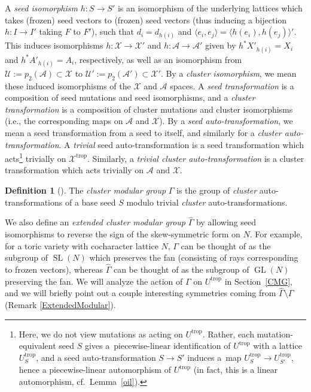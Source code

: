 \documentclass[pdftex]{sigma}
\numberwithin{equation}{section}
\numberwithin{figure}{section}
\numberwithin{table}{section}
\DeclareMathOperator{\SL}{SL}
\DeclareMathOperator{\GL}{GL}
\DeclareMathOperator{\trop}{trop}
\let\rar=\rightarrow
\let\s=\mathcal
\let\wh=\widehat
\theoremstyle{definition}
\newtheorem{dfn}[thm]{Definition}
\begin{document}
A {\it seed isomorphism} $h\colon S\rar S'$ is an isomorphism of the underlying lattices which takes (frozen) seed vectors to (frozen) seed vectors (thus inducing a bijection $h\colon I\rar I'$ taking $F$ to $F'$), such that $d_i=d_{h(i)}$ and $\langle e_i,e_j\rangle = \langle h(e_i),h(e_j)\rangle'$. This induces isomorphisms $h\colon \s{X}\rar \s{X}'$ and $h\colon \s{A}\rar \s{A}'$ given by
	$h^{*}X'_{h(i)} = X_{i}$ and $h^{*}A'_{h(i)} = A_{i}$, respectively, as well as an isomorphism from $\s{U}:=p_2(\s{A})\subset \s{X}$ to $\s{U}':=p_2(\s{A}') \subset \s{X}'$. By a \textit{cluster isomorphism}, we mean these induced isomorphisms of the $\s{X}$ and $\s{A}$ spaces. A {\it seed transformation} is a composition of seed mutations and seed isomorphisms, and a {\it cluster transformation} is a composition of cluster mutations and cluster isomorphisms (i.e., the corresponding maps on $\s{A}$ and $\s{X}$). By a {\it seed auto-transformation}, we mean a seed transformation from a seed to itself, and similarly for a \textit{cluster auto-transformation}. A {\it trivial} seed auto-transformation is a seed transformation which acts\footnote{Here, we do not view mutations as acting on $U^{\trop}$. Rather, each mutation-equivalent seed $S$ gives a~piecewise-linear identification of $U^{\trop}$ with a lattice $U_S^{\trop}$, and a seed auto-transformation $S\rar S'$ induces a~map \mbox{$U_S^{\trop}\rar U_{S'}^{\trop}$}, hence a piecewise-linear automorphism of $U^{\trop}$ (in fact, this is a linear automorphism, cf.\ Lemma~\ref{oil}).} trivially on $\s{X}^{\trop}$. Similarly, a \textit{trivial cluster auto-transformation} is a cluster transformation which acts trivially on $\s{A}$ and $\s{X}$.
	
\begin{dfn}[\cite{FG1}]The {\it cluster modular group} $\Gamma$ is the group of {\it cluster} auto-transformations of a base seed $S$ modulo trivial {\it cluster} auto-transformations.
\end{dfn}

We also define an {\it extended cluster modular group} $\wh{\Gamma}$ by allowing seed isomorphisms to reverse the sign of the skew-symmetric form on $N$. For example, for a toric variety with cocharacter lattice $N$, $\Gamma$ can be thought of as the subgroup of $\SL(N)$ which preserves the fan (consisting of rays corresponding to frozen vectors), whereas $\wh{\Gamma}$ can be thought of as the subgroup of $\GL(N)$ preserving the fan. We will analyze the action of $\Gamma$ on $U^{\trop}$ in Section~\ref{CMG}, and we will briefly point out a couple interesting symmetries coming from $\wh{\Gamma}\setminus \Gamma$ (Remark \ref{ExtendedModular}).
\end{document}
